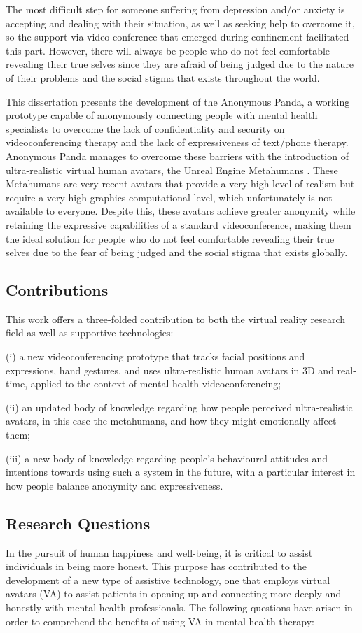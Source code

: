 The most difficult step for someone suffering from depression and/or anxiety is accepting and dealing with their situation, as well as seeking help to overcome it, so the support via video conference that emerged during confinement facilitated this part. However, there will always be people who do not feel comfortable revealing their true selves since they are afraid of being judged due to the nature of their problems and the social stigma that exists throughout the world.

This dissertation presents the development of the Anonymous Panda, a working prototype capable of anonymously connecting people with mental health specialists to overcome the lack of confidentiality and security on videoconferencing therapy and the lack of expressiveness of text/phone therapy. Anonymous Panda manages to overcome these barriers with the introduction of ultra-realistic virtual human avatars, the Unreal Engine Metahumans \cite{EPI21, FAN21}. These Metahumans are very recent avatars that provide a very high level of realism but require a very high graphics computational level, which unfortunately is not available to everyone. Despite this, these avatars achieve greater anonymity while retaining the expressive capabilities of a standard videoconference, making them the ideal solution for people who do not feel comfortable revealing their true selves due to the fear of being judged and the social stigma that exists globally.

\subsection{Contributions}
This work offers a three-folded contribution to both the virtual reality research field as well as supportive technologies:

(i) a new videoconferencing prototype that tracks facial positions and expressions, hand gestures, and uses ultra-realistic human avatars in 3D and real-time, applied to the context of mental health videoconferencing;

(ii) an updated body of knowledge regarding how people perceived ultra-realistic avatars, in this case the metahumans, and how they might emotionally affect them;

(iii) a new body of knowledge regarding people’s behavioural attitudes and intentions towards using such a system in the future, with a particular interest in how people balance anonymity and expressiveness.

\subsection{Research Questions}
In the pursuit of human happiness and well-being, it is critical to assist individuals in being more honest. This purpose has contributed to the development of a new type of assistive technology, one that employs virtual avatars (VA) to assist patients in opening up and connecting more deeply and honestly with mental health professionals. The following questions have arisen in order to comprehend the benefits of using VA in mental health therapy:

